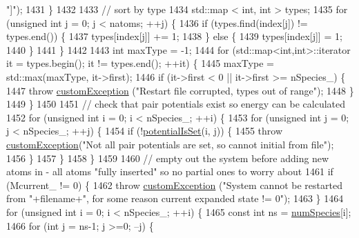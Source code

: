 \begin{DoxyCode}
{      "]"});
1431     \}
1432 
1433     \textcolor{comment}{// sort by type}
1434     std::map < int, int > types;
1435     \textcolor{keywordflow}{for} (\textcolor{keywordtype}{unsigned} \textcolor{keywordtype}{int} j = 0; j < natoms; ++j) \{
1436         \textcolor{keywordflow}{if} (types.find(index[j]) != types.end()) \{
1437             types[index[j]] += 1;
1438         \} \textcolor{keywordflow}{else} \{
1439             types[index[j]] = 1;
1440         \}
1441     \}
1442 
1443     \textcolor{keywordtype}{int} maxType = -1;
1444     \textcolor{keywordflow}{for} (std::map<int,int>::iterator it = types.begin(); it != types.end(); ++it) \{
1445         maxType = std::max(maxType, it->first);
1446         \textcolor{keywordflow}{if} (it->first < 0 || it->first >= nSpecies\_) \{
1447             \textcolor{keywordflow}{throw} \hyperlink{classcustom_exception}{customException} (\textcolor{stringliteral}{"Restart file corrupted, types out of range"});
1448         \}
1449     \}
1450 
1451     \textcolor{comment}{// check that pair potentials exist so energy can be calculated}
1452     \textcolor{keywordflow}{for} (\textcolor{keywordtype}{unsigned} \textcolor{keywordtype}{int} i = 0; i < nSpecies\_; ++i) \{
1453         \textcolor{keywordflow}{for} (\textcolor{keywordtype}{unsigned} \textcolor{keywordtype}{int} j = 0; j < nSpecies\_; ++j) \{
1454             \textcolor{keywordflow}{if} (!\hyperlink{classsim_system_a40af191fae6091e26413ee06ae188ae9}{potentialIsSet}(i, j)) \{
1455                 \textcolor{keywordflow}{throw} \hyperlink{classcustom_exception}{customException}(\textcolor{stringliteral}{"Not all pair potentials are set, so cannot initial
       from file"});
1456             \}
1457         \}
1458     \}
1459 
1460     \textcolor{comment}{// empty out the system before adding new atoms in - all atoms "fully inserted" so no partial ones to
       worry about}
1461     \textcolor{keywordflow}{if} (Mcurrent\_ != 0) \{
1462         \textcolor{keywordflow}{throw} \hyperlink{classcustom_exception}{customException} (\textcolor{stringliteral}{"System cannot be restarted from "}+filename+\textcolor{stringliteral}{", for some
       reason current expanded state != 0"});
1463     \}
1464     \textcolor{keywordflow}{for} (\textcolor{keywordtype}{unsigned} \textcolor{keywordtype}{int} i = 0; i < nSpecies\_; ++i) \{
1465         \textcolor{keyword}{const} \textcolor{keywordtype}{int} ns = \hyperlink{classsim_system_a9eea865e6dc1cff377b1e79c4d9c23f0}{numSpecies}[i];
1466         \textcolor{keywordflow}{for} (\textcolor{keywordtype}{int} j = ns-1; j >=0; --j) \{

\end{DoxyCode}
